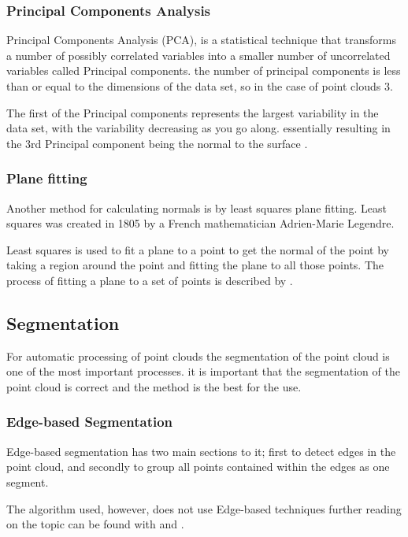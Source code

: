 		\subsubsection{Principal Components Analysis}
			Principal Components Analysis (PCA), is a statistical technique that transforms a number of possibly correlated variables into a smaller number of uncorrelated variables called Principal components. the number of principal components is less than or equal to the dimensions of the data set, so in the case of point clouds 3.
			
			The first of the Principal components represents the largest variability in the data set, with the variability decreasing as you go along. essentially resulting in the 3rd Principal component being the normal to the surface \citep{dunteman_principal_1989}. 
		
		\subsubsection{Plane fitting}
			Another method for calculating normals is by least squares plane fitting. Least squares was created in 1805 by a French mathematician Adrien-Marie Legendre.
			
			Least squares is used to fit a plane to a point to get the normal of the point by taking a region around the point and fitting the plane to all those points. The process of fitting a plane to a set of points is described by \cite{schomaker_fit_1959}.
		
	
		
	\subsection{Segmentation}
		For automatic processing of point clouds the segmentation of the point cloud is one of the most important processes. it is important that the segmentation of the point cloud is correct and the method is the best for the use.
	
		\subsubsection{Edge-based Segmentation}
			Edge-based segmentation has two main sections to it; first to detect edges in the point cloud, and secondly to group all points contained within the edges as one segment.
			
			The algorithm used, however, does not use Edge-based techniques further reading on the topic can be found with \cite{sappa_fast_2001} and \cite{bhanu_automatic_1986}.
			
